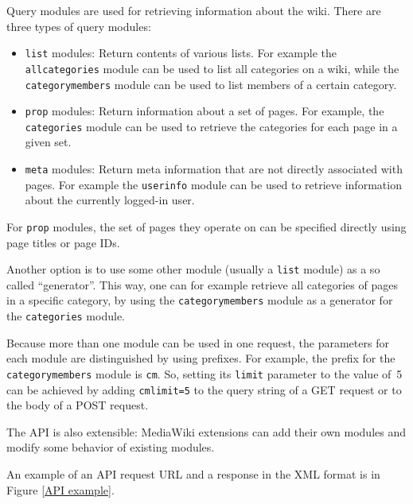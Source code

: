 Query modules are used for retrieving information about the wiki. There are three types of query modules:

\begin{itemize}
\item \texttt{list} modules: Return contents of various lists.
For example the \texttt{all\-categories} module can be used to list all categories on a wiki,
while the \texttt{categorymembers} module can be used to list members of a certain category.
\item \texttt{prop} modules: Return information about a set of pages.
For example, the \texttt{categories} module can be used to retrieve the categories for each page in a given set.
\item \texttt{meta} modules: Return meta information that are not directly associated with pages.
For example the \texttt{userinfo} module can be used to retrieve information about the currently logged-in user.
\end{itemize}

For \texttt{prop} modules, the set of pages they operate on can be specified directly using page titles or page IDs.

Another option is to use some other module (usually a \texttt{list} module) as a so called “generator”.
This way, one can for example retrieve all categories of pages in a specific category,
by using the \texttt{categorymembers} module as a generator for the \texttt{categories} module.

Because more than one module can be used in one request,
the parameters for each module are distinguished by using prefixes.
For example, the prefix for the \texttt{categorymembers} module is \texttt{cm}.
So, setting its \texttt{limit} parameter to the value of~5 can be achieved by
adding \texttt{cmlimit=5} to the query string of a GET request or to the body of a POST request.

The \ac{API} is also extensible: MediaWiki extensions can add their own modules and modify some behavior of existing modules.

An example of an \ac{API} request \ac{URL} and a response in the \ac{XML} format is in Figure \ref{API example}.

